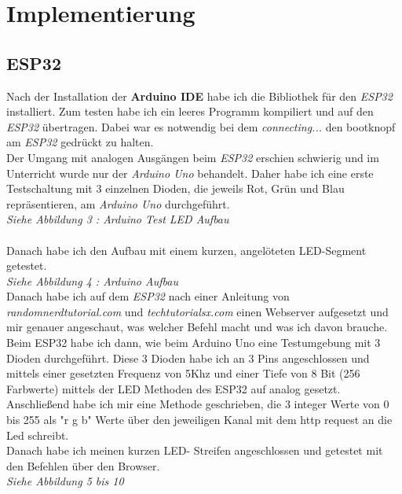 \section{Implementierung}
\subsection{ESP32}
Nach der Installation der \textbf{Arduino IDE} habe ich die Bibliothek für den \textit{ESP32} installiert.
Zum testen habe ich ein leeres Programm kompiliert und auf den \textit{ESP32} übertragen. Dabei war es notwendig bei dem \textit{connecting...} den bootknopf am \textit{ESP32} gedrückt zu halten.\\
Der Umgang mit analogen Ausgängen beim \textit{ESP32} erschien schwierig und im Unterricht wurde nur der \textit{Arduino Uno} behandelt. Daher habe ich eine erste Testschaltung mit 3 einzelnen Dioden, die jeweils Rot, Grün und Blau repräsentieren, am \textit{Arduino Uno} durchgeführt.\\
\textit{Siehe Abbildung 3 : Arduino Test LED Aufbau}\\\\
Danach habe ich den Aufbau mit einem kurzen, angelöteten LED-Segment getestet.\\
\textit{Siehe Abbildung 4 : Arduino Aufbau}\\
Danach habe ich auf dem \textit{ESP32} nach einer Anleitung von \textit{randomnerdtutorial.com} und \textit{techtutorialsx.com} einen Webserver aufgesetzt und mir genauer angeschaut, was welcher Befehl macht und was ich davon brauche. Beim ESP32 habe ich dann, wie beim Arduino Uno eine Testumgebung mit 3 Dioden durchgeführt. Diese 3 Dioden habe ich an 3 Pins angeschlossen und mittels einer gesetzten Frequenz von 5Khz und einer Tiefe von 8 Bit (256 Farbwerte) mittels der LED Methoden des ESP32 auf analog gesetzt.\\
Anschließend habe ich mir eine Methode geschrieben, die 3 integer Werte von 0 bis 255 als "r g b" Werte über den jeweiligen Kanal mit dem http request an die Led schreibt.\\
Danach habe ich meinen kurzen LED- Streifen angeschlossen und getestet mit den Befehlen über den Browser.\\
\textit{Siehe Abbildung 5 bis 10}
